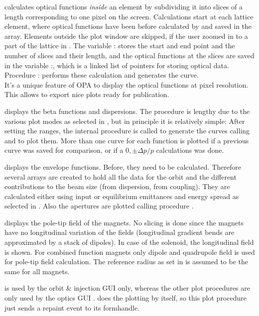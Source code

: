\documentclass[12pt]{article}
\newcommand\code[1]{{\tt #1}}
\newcommand{\unico}[1]{{\color{burntorange}\code{#1}}}
\newcommand{\vrcod}[2]{\opauni{#1}:\unico{#2}}
\newcommand{\opagui}[1]{\colorbox{blue!20}{{\color{black}\code{#1}}}}
\newcommand{\ogui}[1]{\hyperref[#1]{\opagui{#1}}}
\newcommand{\opauni}[1]{\colorbox{orange!30}{{\color{black}\code{#1}}}}
\newcommand{\feature}[1]{{\color{cadmiumgreen} #1}}
\begin{document}
{\unico{SliceCalcN} calculates optical functions {\em inside} an element by subdividing it into slices of a length corresponding to one pixel on the screen. Calculations start at each lattice element, where optical functions have been before calculated by \unico{Linop} and saved in the \unico{Opval} array. Elements outside the plot window are skipped, if the user zoomed in to a part of the lattice in \ogui{opalinop}. The variable \vrcod{globlib}{CurvePlot} stores the start and end point and the number of slices and their length, and the optical functions at the slices are saved in the variable \vrcod{globlib}{Curve}, which is a linked list of pointers for storing optical data. Procedure \vrcod{elemlib}{SlicingN} performs these calculation and generates the curve.\\
\feature{It's a unique feature of OPA to display the optical functions at pixel resolution. This allows to export nice plots ready for publication.}

\unico{PlotBeta} displays the beta functions and dispersions. The procedure is lengthy due to the various plot modes as selected in \ogui{obetenvmag}, but in principle it is relatively simple: After setting the ranges, the internal procedure \unico{BetaCurveN} is called to generate the curves calling \unico{SliceCalcN} and to plot them. More than one curve for each function is plotted if a previous curve was saved for comparison, or if a $0,\pm\Delta p/p$ calculations was done.

\unico{PlotEnv} displays the envelope functions. Before, they need to be calculated. Therefore several arrays are created to hold all the data for the orbit and the different contributions to the beam size (from dispersion, from coupling). They are calculated either using input or equilibrium emittances and energy spread as selected in \ogui{obetenvmag}. Also the apertures are plotted calling procedure \unico{PlotApertures}.

\unico{PlotMag} displays the pole-tip field of the magnets. No slicing is done since the magnets have no longitudinal variation of the fields (longitudinal gradient bends are approximated by a stack of dipoles). In case of the solenoid, the longitudinal field is shown. For combined function magnets only dipole and quadrupole field is used for pole-tip field calculation. The reference radius as set in \ogui{obetenvmag} is assumed to be the same for all magnets.

\unico{PlotOrbit} is used by the orbit \& injection GUI \ogui{opaorbit} only, whereas the other plot procedures are only used by the optics GUI \ogui{opalinop}. \ogui{opaorbit} does the plotting by itself, so this plot procedure just sends a repaint event to its formhandle.\\

}
\end{document}
